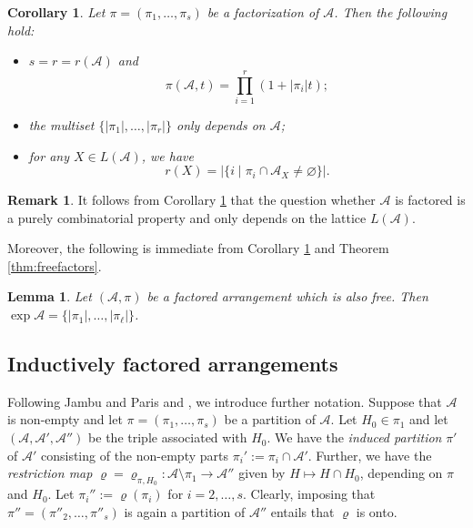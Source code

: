 \documentclass[12pt]{amsart}
\newcommand\CA{{\mathscr A}}
\newcommand\R{{\varrho}}
\numberwithin{equation}{section}
\theoremstyle{plain}
\newtheorem{lemma}[equation]{Lemma}
\newtheorem{corollary}[equation]{Corollary}
\theoremstyle{definition}
\newtheorem{remark}[equation]{Remark}
\begin{document}
\begin{corollary}
	\label{cor:teraofactored}
	Let  $\pi = (\pi_1, \ldots, \pi_s)$ be a factorization of $\CA$.
	Then the following hold:
	\begin{itemize}
		\item[(i)] $s = r = r(\CA)$ and
		\[
		\pi(\CA,t) = \prod_{i=1}^r (1 + |\pi_i|t);
		\]
		\item[(ii)]
		the multiset $\{|\pi_1|, \ldots, |\pi_r|\}$ only depends on $\CA$;
		\item[(iii)]
		for any $X \in L(\CA)$, we have
		\[
		r(X) = |\{ i \mid \pi_i \cap \CA_X \ne \varnothing \}|.
		\]
	\end{itemize}
\end{corollary}

\begin{remark}
	\label{rem:factorediscombinatorial}
	It follows from 
	Corollary \ref{cor:teraofactored} that
	the question whether $\CA$ is factored is a purely combinatorial
	property and only depends on the lattice $L(\CA)$.
\end{remark}

	Moreover, the following is immediate from
		Corollary \ref{cor:teraofactored} and Theorem \ref{thm:freefactors}.

	\begin{lemma}
		\label{lem:FactoredFree}
		Let $(\CA,\pi)$ be a factored arrangement which is also free.
		Then $\exp{\CA} = \{|\pi_1|,\ldots,|\pi_\ell|\}$.
	\end{lemma}

\subsection{Inductively factored arrangements}
\label{sec:indfactored}

Following Jambu and Paris
\cite{jambuparis:factored} and \cite{hogeroehrle:factored},
we introduce further notation.
Suppose that $\CA$ is non-empty and
let $\pi = (\pi_1, \ldots, \pi_s)$ be a  partition  of $\CA$.
Let $H_0 \in \pi_1$ and let
$(\CA, \CA', \CA'')$ be the triple associated with $H_0$.
We have the \emph{induced partition}
$\pi'$ of $\CA'$
consisting of the non-empty parts $\pi_i' := \pi_i \cap \CA'$.
Further, we have the \emph{restriction map}
$\R = \R_{\pi,H_0} : \CA \setminus \pi_1 \to \CA''$ given by
$H \mapsto H \cap H_0$, depending on $\pi$ and $H_0$.
Let $\pi_i'' := \R(\pi_i)$ for $i = 2, \ldots, s$.
Clearly, imposing that
$\pi'' = (\pi''_2, \ldots, \pi''_s)$ is
again a partition of $\CA''$ entails that
$\R$ is onto.
\end{document}
